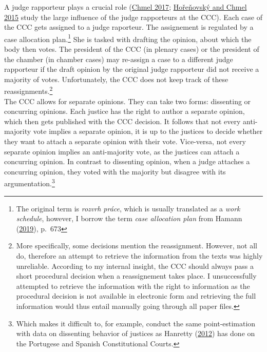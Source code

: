 \documentclass[
  11pt,
]{article}
\begin{document}
A judge rapporteur plays a crucial role
(\protect\hyperlink{ref-chmelZpravodajoveSenatyVliv2017}{Chmel 2017};
\protect\hyperlink{ref-horenovskyProcessMakingConstitutional2015}{Hořeňovský
and Chmel 2015} study the large influence of the judge rapporteurs at
the CCC). Each case of the CCC gets assigned to a judge raporteur. The
assignement is regulated by a case allocation plan.\footnote{The
  original term is \emph{rozvrh práce}, which is usually translated as a
  \emph{work schedule}, however, I borrow the term \emph{case allocation
  plan} from Hamann
  (\protect\hyperlink{ref-hamannGermanFederalCourts2019}{2019}), p.~673}
She is tasked with drafting the opinion, about which the body then
votes. The president of the CCC (in plenary cases) or the president of
the chamber (in chamber cases) may re-assign a case to a different judge
rapporteur if the draft opinion by the original judge rapporteur did not
receive a majority of votes. Unfortunately, the CCC does not keep track
of these reassignments.\footnote{More specifically, some decisions
  mention the reassignment. However, not all do, therefore an attempt to
  retrieve the information from the texts was highly unreliable.
  According to my internal insight, the CCC should always pass a short
  procedural decision when a reassignement takes place. I unsuccessfully
  attempted to retrieve the information with the right to information as
  the procedural decision is not available in electronic form and
  retrieving the full information would thus entail manually going
  through all paper files.}\\

The CCC allows for separate opinions. They can take two forms:
dissenting or concurring opinions. Each justice has the right to author
a separate opinion, which then gets published with the CCC decision. It
follows that not every anti-majority vote implies a separate opinion, it
is up to the justices to decide whether they want to attach a separate
opinion with their vote. Vice-versa, not every separate opinion implies
an anti-majority vote, as the justices can attach a concurring opinion.
In contrast to dissenting opinion, when a judge attaches a concurring
opinion, they voted with the majority but disagree with its
argumentation.\footnote{Which makes it difficult to, for example,
  conduct the same point-estimation with data on dissenting behavior of
  justices as Hanretty
  (\protect\hyperlink{ref-hanrettyDissentIberiaIdeal2012}{2012}) has
  done on the Portugese and Spanish Constitutional Courts.}
\end{document}
